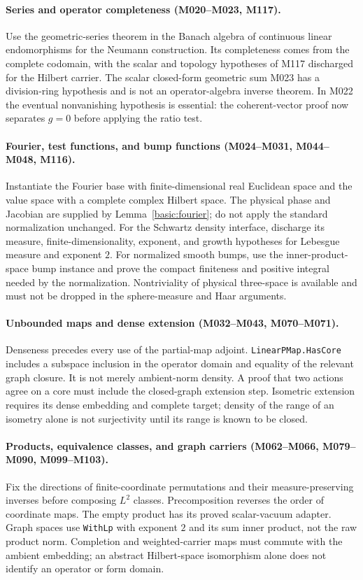 \documentclass[11pt,a4paper]{article}
\theoremstyle{definition}
\theoremstyle{remark}
\begin{document}
\paragraph{Series and operator completeness (M020--M023, M117).}
Use the geometric-series theorem in the Banach algebra of continuous
linear endomorphisms for the Neumann construction. Its completeness
comes from the complete codomain, with the scalar and topology
hypotheses of M117 discharged for the Hilbert carrier. The scalar
closed-form geometric sum M023 has a division-ring hypothesis and is
not an operator-algebra inverse theorem. In M022 the eventual
nonvanishing hypothesis is essential: the coherent-vector proof now
separates $g=0$ before applying the ratio test.

\paragraph{Fourier, test functions, and bump functions
(M024--M031, M044--M048, M116).}
Instantiate the Fourier base with finite-dimensional real Euclidean
space and the value space with a complete complex Hilbert space.
The physical phase and Jacobian are supplied by
Lemma~\ref{basic:fourier}; do not apply the standard normalization
unchanged. For the Schwartz density interface, discharge its measure,
finite-dimensionality, exponent, and growth hypotheses for Lebesgue
measure and exponent $2$. For normalized smooth bumps, use the
inner-product-space bump instance and prove the compact finiteness
and positive integral needed by the normalization. Nontriviality of
physical three-space is available and must not be dropped in the
sphere-measure and Haar arguments.

\paragraph{Unbounded maps and dense extension
(M032--M043, M070--M071).}
Denseness precedes every use of the partial-map adjoint.
\nolinkurl{LinearPMap.HasCore} includes a subspace inclusion in the
operator domain and equality of the relevant graph closure. It is
not merely ambient-norm density. A proof that two actions agree on
a core must include the closed-graph extension step. Isometric
extension requires its dense embedding and complete target; density
of the range of an isometry alone is not surjectivity until its range
is known to be closed.

\paragraph{Products, equivalence classes, and graph carriers
(M062--M066, M079--M090, M099--M103).}
Fix the directions of finite-coordinate permutations and their
measure-preserving inverses before composing $L^2$ classes.
Precomposition reverses the order of coordinate maps. The empty
product has its proved scalar-vacuum adapter. Graph spaces use
\nolinkurl{WithLp} with exponent $2$ and its sum inner product,
not the raw product norm. Completion and weighted-carrier maps
must commute with the ambient embedding; an abstract Hilbert-space
isomorphism alone does not identify an operator or form domain.
\end{document}
